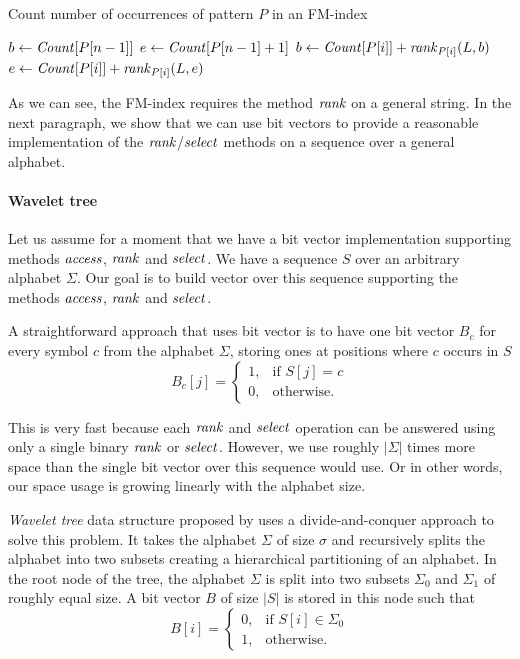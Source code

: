 \begin{algorithm}
\caption{Count number of occurrences of pattern $P$ in an FM-index}\label{alg:fm_index_count}
$b \gets \mathit{Count}[P[n-1]]$\;
$e \gets \mathit{Count}[P[n-1]+1]$\;
 {
	$b \gets \mathit{Count}[P[i]] + \mathit{rank}_{P[i]}(L, b)$\;
	$e \gets \mathit{Count}[P[i]] + \mathit{rank}_{P[i]}(L, e)$\;
}
\end{algorithm}

As we can see, the FM-index requires the method $\mathit{rank}$ on a general string. In the next
paragraph, we show that we can use bit vectors to provide a reasonable implementation of
the $\mathit{rank}$/$\mathit{select}$ methods on a sequence over a general alphabet.

\paragraph{Wavelet tree}
\label{section:WaweletTree}

Let us assume for a moment that we have a bit vector implementation supporting methods $\mathit{access}$,
$\mathit{rank}$ and $\mathit{select}$. We have a sequence $S$ over an arbitrary alphabet $\Sigma$. Our goal is to
build vector over this sequence supporting the methods $\mathit{access}$, $\mathit{rank}$ and $\mathit{select}$.

A straightforward approach that uses bit vector is to have one bit vector $B_c$ for every
symbol $c$ from the alphabet $\Sigma$, storing ones at positions where $c$ occurs in $S$
\[
    B_c[j]= 
\begin{cases}
	1,& \text{if } S[j]=c \\
    0,& \text{otherwise.}
\end{cases}
\]

This is very fast because each $\mathit{rank}$ and $\mathit{select}$ operation can be answered using only a single
binary $\mathit{rank}$ or $\mathit{select}$. However, we use roughly $|\Sigma|$ times more space than the single bit
vector over this sequence would use. Or in other words, our space usage is growing linearly with the
alphabet size.

\textit{Wavelet tree} data structure proposed by \cite{grossi2003high} uses a divide-and-conquer
approach to solve this problem. It takes the alphabet $\Sigma$ of size $\sigma$ and recursively
splits the alphabet into two subsets creating a hierarchical partitioning of an alphabet. In the
root node of the tree, the alphabet $\Sigma$ is split into two subsets $\Sigma_0$ and $\Sigma_1$
of roughly equal size. A bit vector $B$ of size $|S|$ is stored in this node such that
\[
    B[i]= 
\begin{cases}
    0,& \text{if } S[i]\in \Sigma_0\\
    1,              & \text{otherwise.}
\end{cases}
\]

